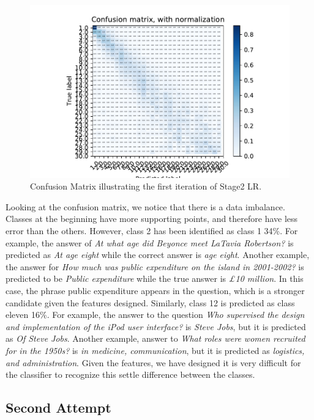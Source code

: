 \begin{figure}
  \includegraphics[scale=1]{../Figures/fig_iter1.pdf} \centering
  \caption{Confusion Matrix illustrating the first iteration of Stage2 LR. }
\end{figure} 



Looking at the confusion matrix, we notice that there is a data imbalance. Classes at the beginning have more supporting points, and therefore have less error than the others. However, class 2 has been identified as class 1 34\%. For example, the answer of \textit{At what age did Beyonce meet LaTavia Robertson?} is predicted as \textit{At age eight} while the correct answer is \textit{age eight}. Another example, the answer for \textit{How much was public expenditure on the island in 2001-2002?} is predicted to be \textit{Public expenditure} while the true answer is \textit{£10 million}. In this case, the phrase public expenditure appears in the question, which is a stronger candidate given the features designed.
Similarly, class 12 is predicted as class eleven 16\%. For example, the answer to the question \textit{Who supervised the design and implementation of the iPod user interface?} is \textit{Steve Jobs}, but it is predicted as \textit{Of Steve Jobs}. Another example, answer to \textit{What roles were women recruited for in the 1950s?} is \textit{in medicine, communication}, but it is predicted as \textit{logistics, and administration}. Given the features, we have designed it is very difficult for the classifier to recognize this settle difference between the classes. 


\subsection{Second Attempt}

